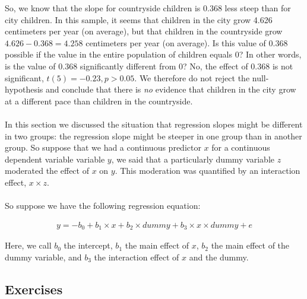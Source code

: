 So, we know that the slope for countryside children is 0.368 less steep than for city children. In this sample, it seems that children in the city grow 4.626 centimeters per year (on average), but that children in the countryside grow $4.626-0.368= 4.258$ centimeters per year (on average). Is this value of 0.368 possible if the value in the entire population of children equals 0? In other words, is the value of 0.368 significantly different from 0? No, the effect of 0.368 is not significant, $t(5)=-0.23, p>0.05$. We therefore do not reject the null-hypothesis and conclude that there is \textit{no} evidence that children in the city grow at a different pace than children in the countryside.\\
\\
In this section we discussed the situation that regression slopes might be different in two groups: the regression slope might be steeper in one group than in another group. So suppose that we had a continuous predictor $x$ for a continuous dependent variable variable $y$, we said that a particularly dummy variable $z$ moderated the effect of $x$ on $y$. This moderation was quantified by an interaction effect, $x \times z$.
\\
\\
So suppose we have the following regression equation:


\begin{eqnarray} 
y = - b_0 + b_1  \times x + b_2  \times dummy +b_3 \times x \times dummy + e \nonumber
\end{eqnarray}

Here, we call $b_0$ the intercept, $b_1$ the main effect of $x$, $b_2$ the main effect of the dummy variable, and $b_3$ the interaction effect of $x$ and the dummy. 


\subsection{Exercises}


